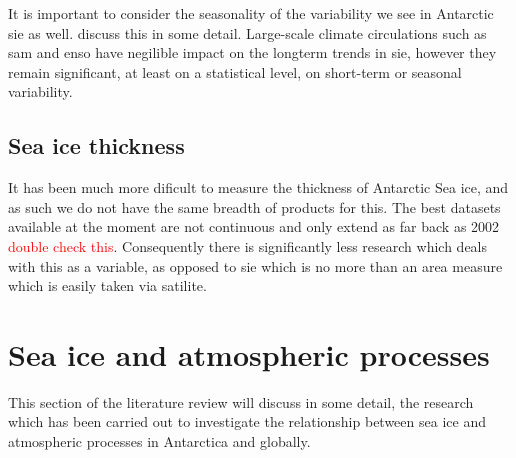 \documentclass[../main.tex]{subfiles}
\begin{document}
It is important to consider the seasonality of the variability we see in Antarctic \gls{sie} as well. \cite{Simpkins} discuss this in some detail. Large-scale climate circulations such as \gls{sam} and \gls{enso} have negilible impact on the longterm trends in \gls{sie}, however they remain significant, at least on a statistical level, on short-term or seasonal variability. 



\subsection*{Sea ice thickness}
It has been much more dificult to measure the thickness of Antarctic Sea ice, and as such we do not have the same breadth of products for this. The best datasets available at the moment are not continuous and only extend as far back as 2002 \textcolor{red}{double check this}. Consequently there is significantly less research which deals with this as a variable, as opposed to \gls{sie} which is no more than an area measure which is easily taken via satilite.





\section{Sea ice and atmospheric processes}
This section of the literature review will discuss in some detail, the research which has been carried out to investigate the relationship between sea ice and atmospheric processes in Antarctica and globally.
\end{document}
